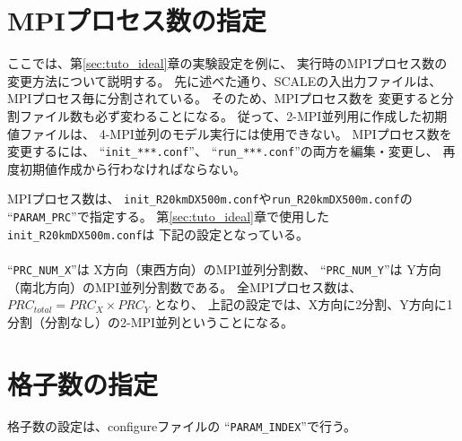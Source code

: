 \section{MPIプロセス数の指定}

ここでは、第\ref{sec:tuto_ideal}章の実験設定を例に、
実行時のMPIプロセス数の変更方法について説明する。
%
先に述べた通り、SCALEの入出力ファイルは、MPIプロセス毎に分割されている。
そのため、MPIプロセス数を
変更すると分割ファイル数も必ず変わることになる。
従って、2-MPI並列用に作成した初期値ファイルは、
4-MPI並列のモデル実行には使用できない。
MPIプロセス数を変更するには、
``\verb|init_***.conf|''、
``\verb|run_***.conf|''の両方を編集・変更し、
再度初期値作成から行わなければならない。

MPIプロセス数は、
\verb|init_R20kmDX500m.conf|や\verb|run_R20kmDX500m.conf|の
``\verb|PARAM_PRC|''で指定する。
%
第\ref{sec:tuto_ideal}章で使用した\verb|init_R20kmDX500m.conf|は
下記の設定となっている。\\

\\

``\verb|PRC_NUM_X|''は X方向（東西方向）のMPI並列分割数、
``\verb|PRC_NUM_Y|''は Y方向（南北方向）のMPI並列分割数である。
全MPIプロセス数は、${PRC}_{total}={PRC}_{X} \times {PRC}_{Y}$ となり、
上記の設定では、X方向に2分割、Y方向に1分割（分割なし）の2-MPI並列ということになる。


\section{格子数の指定}

格子数の設定は、configureファイルの
``\verb|PARAM_INDEX|''で行う。


\\

